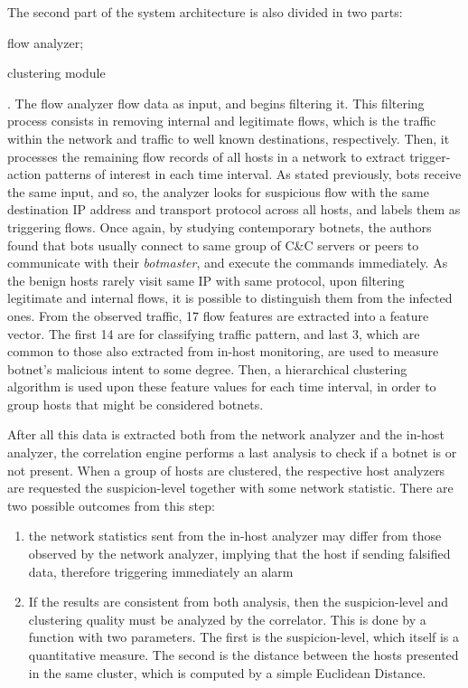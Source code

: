 \documentclass[runningheads,a4paper]{llncs}
\begin{document}
The second part of the system architecture is also divided in two parts: 
\begin{enumerate*}
\item flow analyzer;
\item clustering module
\end{enumerate*}. The flow analyzer flow data as input, and begins filtering it. This filtering process consists in removing internal and legitimate flows, which is the traffic within the network and traffic to well known destinations, respectively. Then, it processes the remaining flow records of all hosts in a network to extract trigger-action patterns of interest in each time interval. As stated previously, bots receive the same input, and so, the analyzer looks for suspicious flow with the same destination IP address and transport protocol across all hosts, and labels them as triggering flows. Once again, by studying contemporary botnets, the authors found that bots usually connect to same group of C\&C servers or peers to communicate with their \textit{botmaster}, and execute the commands immediately. As the benign hosts rarely visit same IP with same protocol, upon filtering legitimate and internal flows, it is possible to distinguish them from the infected ones. From the observed traffic, 17 flow features are extracted into a feature vector. The first 14 are for classifying traffic pattern, and last 3, which are common to those also extracted from in-host monitoring, are used to measure botnet's malicious intent to some degree. Then, a hierarchical clustering algorithm is used upon these feature values for each time interval, in order to group hosts that might be considered botnets. 

After all this data is extracted both from the network analyzer and the in-host analyzer, the correlation engine performs a last analysis to check if a botnet is or not present. When a group of hosts are clustered, the respective host analyzers are requested the suspicion-level together with some network statistic. There are two possible outcomes from this step: 
\begin{enumerate}
\item the network statistics sent from the in-host analyzer may differ from those observed by the network analyzer, implying that the host if sending falsified data, therefore triggering immediately an alarm
\item If the results are consistent from both analysis, then the suspicion-level and clustering quality must be analyzed by the correlator. This is done by a function with two parameters. The first is the suspicion-level, which itself is a quantitative measure. The second is the distance between the hosts presented in the same cluster, which is computed by a simple Euclidean Distance. 
\end{enumerate}
\end{document}
